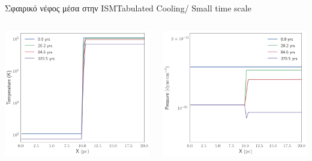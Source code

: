 \documentclass{beamer}
\begin{document}
\begin{frame}{Σφαιρικό νέφος μέσα στην ISM}{Tabulated Cooling/ Small time scale}
	\begin{columns}
			\begin{center}
				\includegraphics[width=1\linewidth]{../Document/DataImages/TabCoolingTMPprofile-micro}
			\end{center}
			\begin{center}
				\includegraphics[width=1\linewidth]{../Document/DataImages/TabCoolingPRSprofile-micro}
			\end{center}
	\end{columns}
\end{frame}
\end{document}
